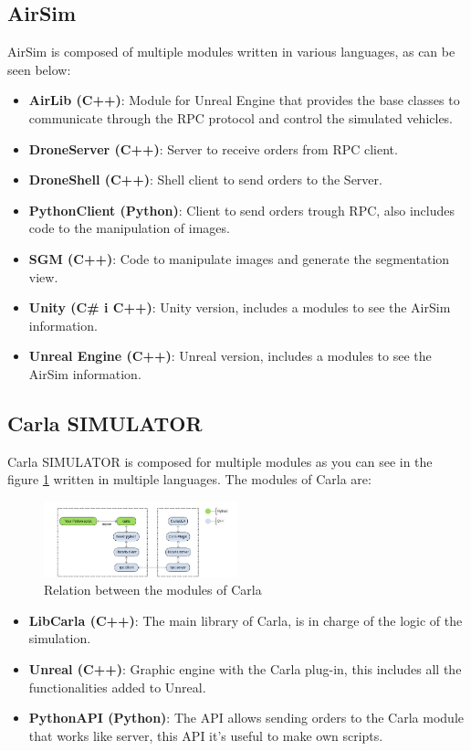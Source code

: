 \documentclass[10pt,a4paper,twocolumn,twoside]{article}
\begin{document}
\subsection{AirSim} 
AirSim is composed of multiple modules written in various languages, as can be seen below:

\begin{itemize}
	\item \textbf{AirLib (C++)}: Module for Unreal Engine that provides the base classes to communicate through the RPC protocol and control the simulated vehicles.
	\item \textbf{DroneServer (C++)}: Server to receive orders from RPC client.
  	\item \textbf{DroneShell (C++)}: Shell client to send orders to the Server.
  	\item \textbf{PythonClient (Python)}: Client to send orders trough RPC, also includes code to the manipulation of images.
  	\item \textbf{SGM (C++)}: Code to manipulate images and generate the segmentation view.
    \item \textbf{Unity (C\# i C++)}: Unity version, includes a modules to see the AirSim information.
    \item \textbf{Unreal Engine (C++)}: Unreal version, includes a modules to see the AirSim information.
\end{itemize}

\subsection{Carla SIMULATOR}

Carla SIMULATOR is composed for multiple modules as you can see in the figure \ref{fig-carlamodules} written in multiple languages. The modules of Carla are:

\begin{figure}[!h]
\centering
  	\includegraphics[width=0.5\textwidth]{carlamodules}
	\caption{Relation between the modules of Carla}
	\label{fig-carlamodules}
\end{figure}

\begin{itemize}
 \item \textbf{LibCarla (C++)}: The main library of Carla, is in charge of the logic of the simulation.
 \item \textbf{Unreal (C++)}: Graphic engine with the Carla plug-in, this includes all the functionalities added to Unreal.
 \item \textbf{PythonAPI (Python)}: The API allows sending orders to the Carla module that works like server, this API it's useful to make own scripts.
\end{itemize}
\end{document}
